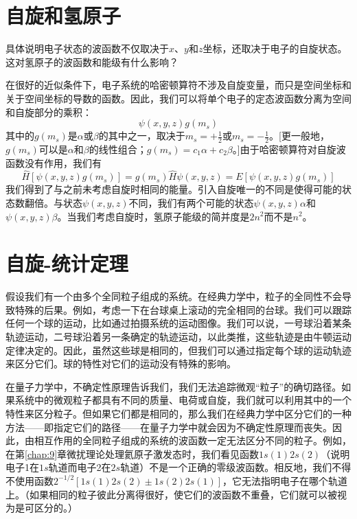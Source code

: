\section{自旋和氢原子}
\label{sec:10.2 Spin and the Hydrogen Atom}

    具体说明电子状态的波函数不仅取决于$x$、$y$和$z$坐标，还取决于电子的自旋状态。这对氢原子的波函数和能级有什么影响？

    在很好的近似条件下，电子系统的哈密顿算符不涉及自旋变量，而只是空间坐标和关于空间坐标的导数的函数。因此，我们可以将单个电子的定态波函数分离为空间和自旋部分的乘积：
    \begin{equation*}
        \psi\left(x,y,z\right)g\left(m_s\right)
    \end{equation*}
    其中的$g\left(m_s\right)$是$\alpha$或$\beta$的其中之一，取决于$m_s = +\frac{1}{2}$或$m_s = -\frac{1}{2}$。[更一般地，$g\left(m_s\right)$可以是$\alpha$和$\beta$的线性组合；$g\left(m_s\right) = c_1 \alpha + c_2\beta$。]由于哈密顿算符对自旋波函数没有作用，我们有
    \begin{equation*}
        \hat{H} \left[\psi\left(x, y, z\right) g\left(m_s\right)\right] = g\left(m_s\right) \hat{H} \psi\left(x, y, z\right) = E \left[\psi\left(x, y, z\right) g\left(m_s\right)\right]
    \end{equation*}
    我们得到了与之前未考虑自旋时相同的能量。引入自旋唯一的不同是使得可能的状态数翻倍。与状态$\psi\left(x, y, z\right)$不同，我们有两个可能的状态$\psi\left(x, y, z\right) \alpha$和$\psi\left(x, y, z\right) \beta$。当我们考虑自旋时，氢原子能级的简并度是$2n^2$而不是$n^2$。

\section{自旋-统计定理}
\label{sec:10.3 Spin-Statistics Theorem}

    假设我们有一个由多个全同粒子组成的系统。在经典力学中，粒子的全同性不会导致特殊的后果。例如，考虑一下在台球桌上滚动的完全相同的台球。我们可以跟踪任何一个球的运动，比如通过拍摄系统的运动图像。我们可以说，一号球沿着某条轨迹运动，二号球沿着另一条确定的轨迹运动，以此类推，这些轨迹是由牛顿运动定律决定的。因此，虽然这些球是相同的，但我们可以通过指定每个球的运动轨迹来区分它们。球的特性对它们的运动没有特殊的影响。

    在量子力学中，不确定性原理告诉我们，我们无法追踪微观“粒子”的确切路径。如果系统中的微观粒子都具有不同的质量、电荷或自旋，我们就可以利用其中的一个特性来区分粒子。但如果它们都是相同的，那么我们在经典力学中区分它们的一种方法——即指定它们的路径——在量子力学中就会因为不确定性原理而丧失。因此，由相互作用的全同粒子组成的系统的波函数一定无法区分不同的粒子。例如，在第\ref{chap:9}章微扰理论处理氦原子激发态时，我们看见函数$1s\left(1\right)2s\left(2\right)$（说明电子1在$1s$轨道而电子2在$2s$轨道）不是一个正确的零级波函数。相反地，我们不得不使用函数$2^{-1/2}\left[1s\left(1\right)2s\left(2\right) \pm 1s\left(2\right)2s\left(1\right)\right]$，它无法指明电子在哪个轨道上。（如果相同的粒子彼此分离得很好，使它们的波函数不重叠，它们就可以被视为是可区分的。）

